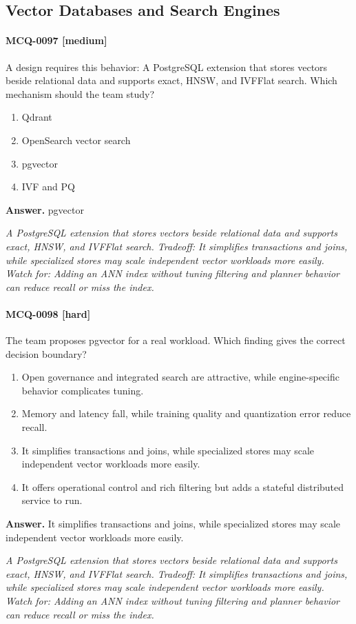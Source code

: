 \subsection{Vector Databases and Search Engines}
\paragraph{MCQ-0097 [medium]} A design requires this behavior: A PostgreSQL extension that stores vectors beside relational data and supports exact, HNSW, and IVFFlat search. Which mechanism should the team study?
\begin{enumerate}[label=\Alph*.]
\item Qdrant
\item OpenSearch vector search
\item pgvector
\item IVF and PQ
\end{enumerate}
\noindent\textbf{Answer.} pgvector
\par\textit{A PostgreSQL extension that stores vectors beside relational data and supports exact, HNSW, and IVFFlat search. Tradeoff: It simplifies transactions and joins, while specialized stores may scale independent vector workloads more easily. Watch for: Adding an ANN index without tuning filtering and planner behavior can reduce recall or miss the index.}
\paragraph{MCQ-0098 [hard]} The team proposes pgvector for a real workload. Which finding gives the correct decision boundary?
\begin{enumerate}[label=\Alph*.]
\item Open governance and integrated search are attractive, while engine-specific behavior complicates tuning.
\item Memory and latency fall, while training quality and quantization error reduce recall.
\item It simplifies transactions and joins, while specialized stores may scale independent vector workloads more easily.
\item It offers operational control and rich filtering but adds a stateful distributed service to run.
\end{enumerate}
\noindent\textbf{Answer.} It simplifies transactions and joins, while specialized stores may scale independent vector workloads more easily.
\par\textit{A PostgreSQL extension that stores vectors beside relational data and supports exact, HNSW, and IVFFlat search. Tradeoff: It simplifies transactions and joins, while specialized stores may scale independent vector workloads more easily. Watch for: Adding an ANN index without tuning filtering and planner behavior can reduce recall or miss the index.}
